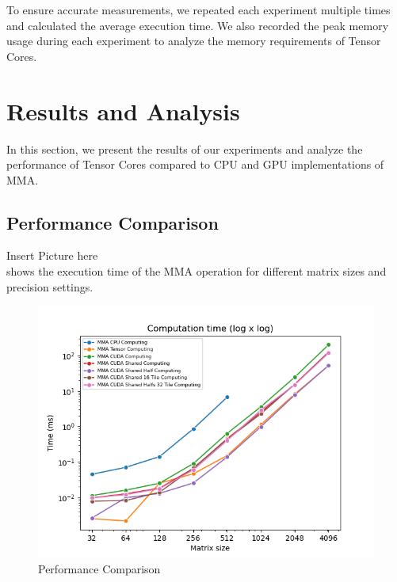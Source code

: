 \documentclass[conference]{IEEEtran}
\begin{document}
  To ensure accurate measurements, we repeated each experiment multiple times and calculated 
  the average execution time. We also recorded the peak memory usage during each experiment to 
  analyze the memory requirements of Tensor Cores.
  
  \section{Results and Analysis}\label{sec:results-analysis}
  
  In this section, we present the results of our experiments and analyze the performance of 
  Tensor Cores compared to CPU and GPU implementations of MMA.

  
  \subsection{Performance Comparison}\label{sec:performance-comparison}

  Insert Picture here\\
  shows the execution time of the MMA operation for different matrix sizes and precision settings.
  
  \begin{figure}[htbp]
    \centering
    \includegraphics[scale=0.4]{figures/Comp_time.png}
    \caption{Performance Comparison}
    \label{fig:performance-comparison}
  \end{figure}
\end{document}
